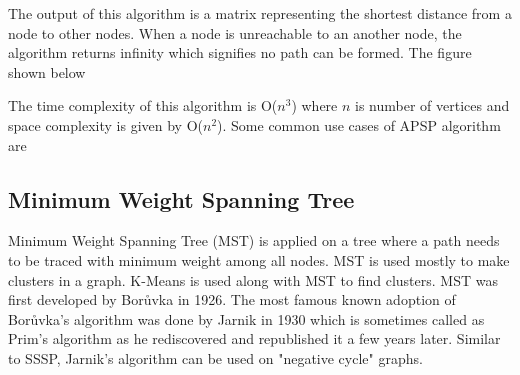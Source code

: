 \documentclass[journal,twoside,web]{ieeecolor}
\begin{document}
The output of this algorithm is a matrix representing the shortest distance from a node to other nodes. When a node is unreachable to an another node, the algorithm returns infinity which signifies no path can be formed. The figure shown below  



The time complexity of this algorithm is O($n^3$) where $n$ is number of vertices and space complexity is given by O($n^2$). Some common use cases of APSP algorithm are


\subsection{Minimum Weight Spanning Tree}
Minimum Weight Spanning Tree (MST) is applied on a tree where a path needs to be traced with minimum weight among all nodes. MST is used mostly to make clusters in a graph. K-Means is used along with MST to find clusters. MST was first developed by Borůvka in 1926\cite{47}. The most famous known adoption of Borůvka's algorithm was done by Jarnik in 1930\cite{48} which is sometimes called as Prim's algorithm as he rediscovered and republished it a few years later\cite{49}. Similar to SSSP, Jarnik's algorithm can be used on "negative cycle" graphs.
\end{document}
